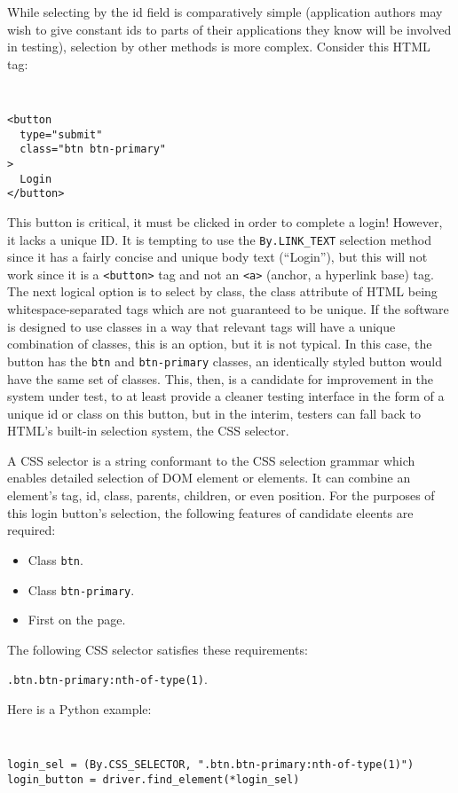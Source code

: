 While selecting by the id field is comparatively simple (application authors may wish to give constant ids to parts of their applications they know will be involved in testing)\citep{DOMStand78}, selection by other methods is more complex. Consider this HTML tag:

{\tt
\begin{verbatim}
<button
  type="submit"
  class="btn btn-primary"
>
  Login
</button>
\end{verbatim}
}

This button is critical, it must be clicked in order to complete a login! However, it lacks a unique ID. It is tempting to use the \texttt{By.LINK\_TEXT} selection method since it has a fairly concise and unique body text (``Login''), but this will not work since it is a \texttt{<button>} tag and not an \texttt{<a>} (anchor, a hyperlink base) tag. The next logical option is to select by class, the class attribute of HTML being whitespace-separated tags which are not guaranteed to be unique. If the software is designed to use classes in a way that relevant tags will have a unique combination of classes, this is an option, but it is not typical. In this case, the button has the \texttt{btn} and \texttt{btn-primary} classes, an identically styled button would have the same set of classes. This, then, is a candidate for improvement in the system under test, to at least provide a cleaner testing interface in the form of a unique id or class on this button, but in the interim, testers can fall back to HTML's built-in selection system, the CSS selector.

A CSS selector is a string conformant to the CSS selection grammar \citep{Selector54} which enables detailed selection of DOM element or elements. It can combine an element's tag, id, class, parents, children, or even position. For the purposes of this login button's selection, the following features of candidate eleents are required:
\begin{itemize}
\item Class \texttt{btn}.
\item Class \texttt{btn-primary}.
\item First on the page.
\end{itemize}

The following CSS selector satisfies these requirements:

\texttt{.btn.btn-primary:nth-of-type(1)}.

Here is a Python example:
{\tt
\begin{verbatim}
login_sel = (By.CSS_SELECTOR, ".btn.btn-primary:nth-of-type(1)")
login_button = driver.find_element(*login_sel)
\end{verbatim}
}

